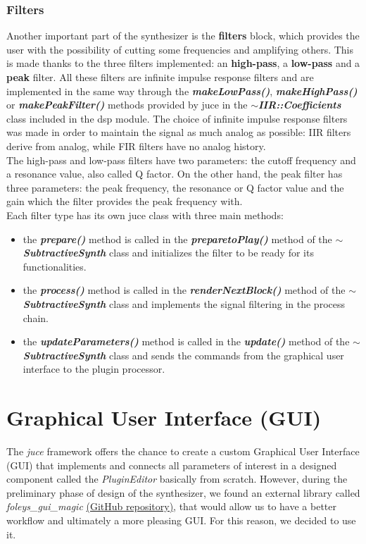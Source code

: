 \documentclass{article}
\begin{document}
\subsubsection{Filters}

Another important part of the synthesizer is the \textbf{filters} block, which provides the user with the possibility of cutting some frequencies and amplifying others. This is made thanks to the three filters implemented: an \textbf{high-pass}, a \textbf{low-pass} and a \textbf{peak} filter. All these filters are infinite impulse response filters and are implemented in the same way through the \textbf{\textit{makeLowPass()}}, \textbf{\textit{makeHighPass()}} or \textbf{\textit{makePeakFilter()}} methods provided by juce in the \textbf{\textit{$\sim$IIR::Coefficients}} class included in the dsp module. The choice of infinite impulse response filters was made in order to maintain the signal as much analog as possible: IIR filters derive from analog, while FIR filters have no analog history. 
\\The high-pass and low-pass filters have two parameters: the cutoff frequency and a resonance value, also called Q factor. On the other hand, the peak filter has three parameters: the peak frequency, the resonance or Q factor value and the gain which the filter provides the peak frequency with.
\\Each filter type has its own juce class with three main methods: 
\begin{itemize}
    \item the \textbf{\textit{prepare()}} method is called in the \textbf{\textit{preparetoPlay()}} method of the \textbf{\textit{$\sim$SubtractiveSynth}} class and initializes the filter to be ready for its functionalities.
    \item the \textbf{\textit{process()}} method is called in the \textbf{\textit{renderNextBlock()}} method of the \textbf{\textit{$\sim$SubtractiveSynth}} class and implements the signal filtering in the process chain.
    \item the \textbf{\textit{updateParameters()}} method is called in the \textbf{\textit{update()}} method of the \textbf{\textit{$\sim$SubtractiveSynth}} class and sends the commands from the graphical user interface to the plugin processor.
\end{itemize}

\section{Graphical User Interface (GUI)}
The \textit{juce} framework offers the chance to create a custom Graphical User Interface (GUI) that implements and connects all parameters of interest in a designed component called the \textit{PluginEditor} basically from scratch. However, during the preliminary phase of design of the synthesizer, we found an external library called \textit{foleys\_gui\_magic} \href{https://github.com/ffAudio/foleys_gui_magic}{(GitHub repository)}, that would allow us to have a better workflow and ultimately a more pleasing GUI. For this reason, we decided  to use it.
\end{document}
